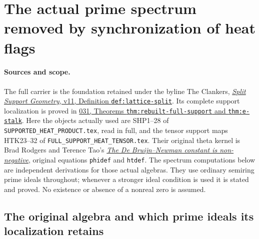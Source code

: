\section{The actual prime spectrum removed by synchronization of heat flags}
\label{sec:heat-flag-prime-spectrum}

\paragraph{Sources and scope.}
The full carrier is the foundation retained under the byline The Clankers,
\href{https://github.com/KokunoYumeto/zeta-function-research-reader/blob/a2851f9eb352e7e4376bc629de86fa4ed9c1c434/workbenches/splitzero-tandem/foundations/split-support-geometry-v11/split_support_geometry_arithmetic_curve_v11.tex}{\emph{Split Support Geometry}, v11, Definition \texttt{def:lattice-split}}.
Its complete support localization is proved in
\href{https://github.com/KokunoYumeto/zeta-function-research-reader/blob/3c78cfbd9e194d35117b33277c421c6564ce3dbf/workbenches/splitzero-tandem/continuations/20260923-full-prime-support/031/01_REBUILT_MATHEMATICS.tex}{031, Theorems \texttt{thm:rebuilt-full-support} and \texttt{thm:e-stalk}}.
Here the objects actually used are SHP1--28 of
\nolinkurl{SUPPORTED_HEAT_PRODUCT.tex}, read in full, and the tensor
support maps HTK23--32 of \nolinkurl{FULL_SUPPORT_HEAT_TENSOR.tex}.
Their original theta kernel is Brad Rodgers and Terence Tao's
\href{https://arxiv.org/abs/1801.05914v5}{\emph{The De Bruijn--Newman constant is non-negative}}, original equations
\texttt{phidef} and \texttt{htdef}.
The spectrum computations below are independent derivations for those
actual algebras. They use ordinary semiring prime ideals throughout;
whenever a stronger ideal condition is used it is stated and proved.
No existence or absence of a nonreal zero is assumed.

\subsection{The original algebra and which prime ideals its localization retains}

